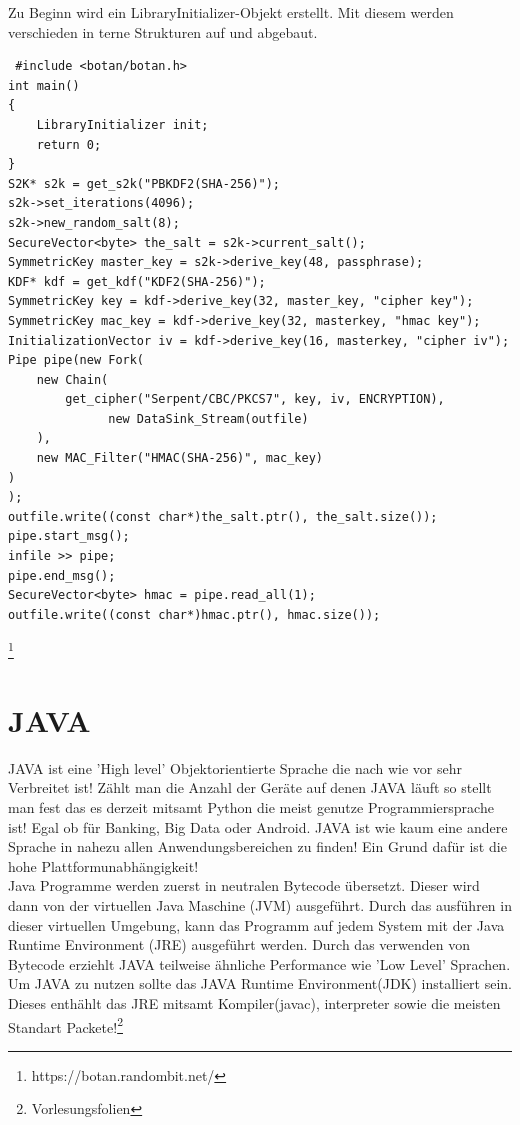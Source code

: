 \documentclass[a4paper,12pt]{scrartcl}
\begin{document}
Zu Beginn wird ein LibraryInitializer-Objekt erstellt. Mit diesem werden verschieden in
terne Strukturen auf und abgebaut.
\begin{verbatim}
 #include <botan/botan.h>
int main()
{
	LibraryInitializer init;
	return 0;
}
S2K* s2k = get_s2k("PBKDF2(SHA-256)");
s2k->set_iterations(4096);
s2k->new_random_salt(8);
SecureVector<byte> the_salt = s2k->current_salt();
SymmetricKey master_key = s2k->derive_key(48, passphrase);
KDF* kdf = get_kdf("KDF2(SHA-256)");
SymmetricKey key = kdf->derive_key(32, master_key, "cipher key");
SymmetricKey mac_key = kdf->derive_key(32, masterkey, "hmac key");
InitializationVector iv = kdf->derive_key(16, masterkey, "cipher iv");
Pipe pipe(new Fork(
	new Chain(
		get_cipher("Serpent/CBC/PKCS7", key, iv, ENCRYPTION),
			  new DataSink_Stream(outfile)
	),
	new MAC_Filter("HMAC(SHA-256)", mac_key)
)
);
outfile.write((const char*)the_salt.ptr(), the_salt.size());
pipe.start_msg();
infile >> pipe;
pipe.end_msg();
SecureVector<byte> hmac = pipe.read_all(1);
outfile.write((const char*)hmac.ptr(), hmac.size());
\end{verbatim}
\footnote{https://botan.randombit.net/}
\newpage
\section{JAVA}
JAVA ist eine 'High level' Objektorientierte Sprache die nach wie vor sehr Verbreitet ist! Zählt man die Anzahl der Geräte auf denen JAVA läuft so stellt man fest das es  derzeit mitsamt Python die meist genutze Programmiersprache ist! Egal ob für Banking, Big Data oder Android. JAVA ist wie kaum eine andere Sprache in nahezu allen Anwendungsbereichen zu finden! Ein Grund dafür ist die hohe Plattformunabhängigkeit!\\
Java Programme werden zuerst in neutralen Bytecode übersetzt. Dieser wird dann von der
virtuellen Java Maschine (JVM) ausgeführt. Durch das ausführen in dieser virtuellen Umgebung, kann das Programm auf jedem System mit der Java Runtime Environment (JRE)
ausgeführt werden. Durch das verwenden von Bytecode erziehlt JAVA teilweise ähnliche Performance wie 'Low Level' Sprachen.\\
Um JAVA zu nutzen sollte das JAVA Runtime Environment(JDK) installiert sein. Dieses enthählt das JRE mitsamt Kompiler(javac), interpreter sowie die meisten Standart Packete!\footnote{Vorlesungsfolien}
\end{document}
